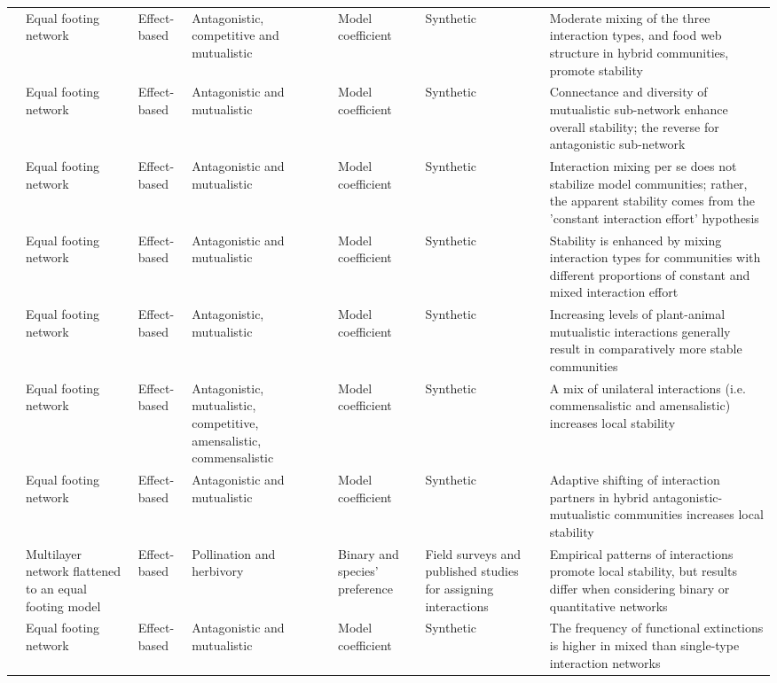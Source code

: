 {\begin{landscape}
\begin{footnotesize}
\begin{longtable}{p{1.5cm}p{1.5cm}p{2cm}p{2cm}p{2cm}p{2cm}p{4cm}}
\citealt{Mougi2014} & %
Equal footing network &
Effect-based &
Antagonistic, competitive and mutualistic &
Model coefficient &
Synthetic &
Moderate mixing of the three interaction types, and food web structure in hybrid communities, promote stability\\%
\citealt{Sauve2014} & %
Equal footing network &
Effect-based &
Antagonistic and mutualistic &
Model coefficient &
Synthetic &
Connectance and diversity of mutualistic sub-network enhance overall stability; the reverse for antagonistic sub-network\\%
\citealt{Suweis2014} & %
Equal footing network &
Effect-based &
Antagonistic and mutualistic &
Model coefficient &
Synthetic &
Interaction mixing per se does not stabilize model communities; rather, the apparent stability comes from the {}'constant interaction effort{}' hypothesis\\%
\citealt{Kondoh2015} & %
Equal footing network &
Effect-based &
Antagonistic and mutualistic &
Model coefficient &
Synthetic &
Stability is enhanced by mixing interaction types for communities with different proportions of constant and mixed interaction effort\\%
\citealt{Lurgi2016} & %
Equal footing network &
Effect-based &
Antagonistic, mutualistic &
Model coefficient &
Synthetic &
Increasing levels of plant-animal mutualistic interactions generally result in comparatively more stable communities\\%
\citealt{Mougi2016a} & %
Equal footing network &
Effect-based &
Antagonistic, mutualistic, competitive, amensalistic, commensalistic &
Model coefficient &
Synthetic &
A mix of unilateral interactions (i.e. commensalistic and amensalistic) increases local stability\\%
\citealt{Mougi2016b} & %
Equal footing network &
Effect-based &
Antagonistic and mutualistic &
Model coefficient &
Synthetic &
Adaptive shifting of interaction partners in hybrid antagonistic-mutualistic communities increases local stability\\%
\citealt{Sauve2016} & %
Multilayer network flattened to an equal footing model &
Effect-based &
Pollination and herbivory &
Binary and species' preference  &
Field surveys and published studies for assigning interactions &
Empirical patterns of interactions promote local stability, but results differ when considering binary or quantitative networks\\%
\citealt{Sellman2016} & %
Equal footing network &
Effect-based &
Antagonistic and mutualistic &
Model coefficient &
Synthetic &
The frequency of functional extinctions is higher in mixed than single-type interaction networks\\\hline
\end{longtable}
\end{footnotesize}
\end{landscape}
\clearpage%
}


